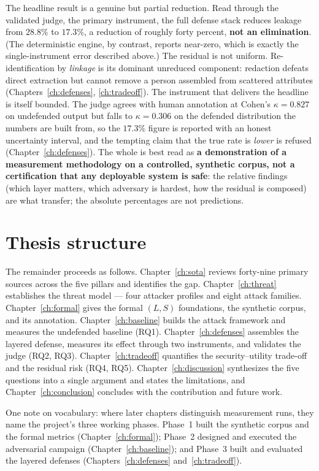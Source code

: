 The headline result is a genuine but partial reduction. Read through the validated judge, the
primary instrument, the full defense stack reduces leakage from $28.8\%$ to $17.3\%$, a reduction
of roughly forty percent, \textbf{not an elimination}. (The deterministic engine, by contrast,
reports near-zero, which is exactly the single-instrument error described above.) The residual is
not uniform. Re-identification by \emph{linkage} is its dominant unreduced component: redaction
defeats direct extraction but cannot remove a person assembled from scattered attributes
(Chapters~\ref{ch:defenses}, \ref{ch:tradeoff}). The instrument that delivers the headline is
itself bounded. The judge agrees with human annotation at Cohen's $\kappa = 0.827$ on undefended
output but falls to $\kappa = 0.306$ on the defended distribution the numbers are built from, so
the $17.3\%$ figure is reported with an honest uncertainty interval, and the tempting claim that
the true rate is \emph{lower} is refused (Chapter~\ref{ch:defenses}). The whole is best read as
\textbf{a demonstration of a measurement methodology on a controlled, synthetic corpus, not a
certification that any deployable system is safe}: the relative findings (which layer matters,
which adversary is hardest, how the residual is composed) are what transfer; the absolute
percentages are not predictions.

\section{Thesis structure}
\label{sec:intro-structure}

The remainder proceeds as follows. Chapter~\ref{ch:sota} reviews forty-nine primary sources
across the five pillars and identifies the gap. Chapter~\ref{ch:threat} establishes the threat
model --- four attacker profiles and eight attack families. Chapter~\ref{ch:formal} gives the
formal $(L,S)$ foundations, the synthetic corpus, and its annotation. Chapter~\ref{ch:baseline} builds the attack framework and measures the
undefended baseline (RQ1). Chapter~\ref{ch:defenses} assembles the layered defense, measures its
effect through two instruments, and validates the judge (RQ2, RQ3). Chapter~\ref{ch:tradeoff}
quantifies the security--utility trade-off and the residual risk (RQ4, RQ5).
Chapter~\ref{ch:discussion} synthesizes the five questions into a single argument and states the
limitations, and Chapter~\ref{ch:conclusion} concludes with the contribution and future work.

One note on vocabulary: where later chapters distinguish measurement runs, they name the
project's three working phases. Phase~1 built the synthetic corpus and the formal metrics
(Chapter~\ref{ch:formal}); Phase~2 designed and executed the adversarial campaign
(Chapter~\ref{ch:baseline}); and Phase~3 built and evaluated the layered defenses
(Chapters~\ref{ch:defenses} and~\ref{ch:tradeoff}).


